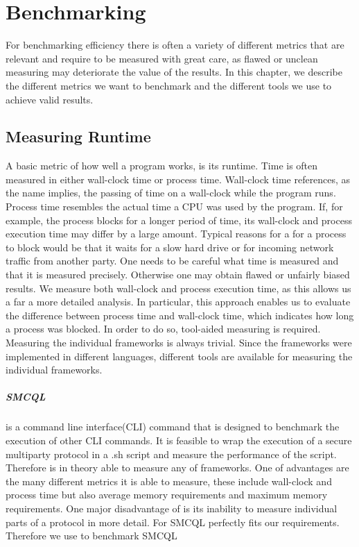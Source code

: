 	
\chapter{Benchmarking}
\label{Benchmarking}
For benchmarking efficiency there is often a variety of different metrics that are relevant and require to be measured with great care, as flawed or unclean measuring may deteriorate the value of the results. In this chapter, we describe the different metrics we want to benchmark and the different tools we use to achieve valid results. 

\section{Measuring Runtime}
A basic metric of how well a program works, is its runtime. Time is often measured in either wall-clock time or process time. Wall-clock time references, as the name implies, the passing of time on a wall-clock while the program runs. 
Process time resembles the actual time a CPU was used by the program. If, for example, the process blocks for a longer period of time, its wall-clock and process execution time may differ by a large amount. Typical reasons for a for a process to block would be that it waits for a slow hard drive or for incoming network traffic from another party. One needs to be careful what time is measured and that it is measured precisely. Otherwise one may obtain flawed or unfairly biased results. We measure both wall-clock and process execution time, as this allows us a far a more detailed analysis. In particular, this approach enables us to evaluate the difference between process time and wall-clock time, which indicates how long a process was blocked. In order to do so, tool-aided measuring is required. Measuring the individual frameworks is always trivial. Since the frameworks were implemented in different languages, different tools are available for measuring the individual frameworks. 
\label{time}	
\paragraph{SMCQL}%
 \cite{time_sh} is a command line interface(CLI) command that is designed to benchmark the execution of other CLI commands. It is feasible to wrap the execution of a secure multiparty protocol in a .sh script and measure the performance of the script. Therefore  is in theory able to measure any of frameworks. One of  advantages are the many different metrics it is able to measure, these include wall-clock and process time but also average memory requirements and maximum memory requirements. One major disadvantage of  is its inability to measure individual parts of a protocol in more detail. For SMCQL  perfectly fits our requirements. Therefore we use  to benchmark SMCQL  


